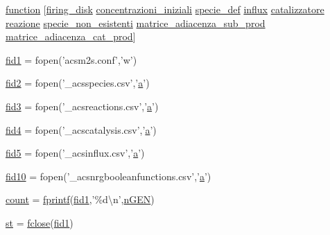 \begin{DoxyCompactItemize}
\item 
\hyperlink{a00110_a4b4c670b101bf7a838f775e008fa6255}{function} \mbox{[}\hyperlink{a00103_acb72987b5000cf59c6f81c482e2ac8ac}{firing\-\_\-disk} \hyperlink{a00103_a89801fa89eee3ba40f6610f290d6f6c3}{concentrazioni\-\_\-iniziali} \hyperlink{a00110_a85d979dc881d9a49537b0f43daa2b360}{specie\-\_\-def} \hyperlink{a00107_a902e747aeec6b345d3a057099152f41f}{influx} \hyperlink{a00102_a14959eaa108dcffcec704a207775f7e8}{catalizzatore} \hyperlink{a00110_a65cf6e12ba9a8c10222f3f1f71f7c95f}{reazione} \hyperlink{a00110_adfcfd2749a68fa87ece8ec3caa194b3d}{specie\-\_\-non\-\_\-esistenti} \hyperlink{a00104_a3568a7566d3871de5460f8fe96044c26}{matrice\-\_\-adiacenza\-\_\-sub\-\_\-prod} \hyperlink{a00104_a23c87a364bec91d4eb554b9eabe0b767}{matrice\-\_\-adiacenza\-\_\-cat\-\_\-prod}\mbox{]}
\item 
\hyperlink{a00110_aff1e821fc5f97a0758f74b5cbd00cacf}{fid1} = fopen('acsm2s.\-conf','w')
\item 
\hyperlink{a00110_a11af2c31c7926441f43875d99b4577d2}{fid2} = fopen('\-\_\-acsspecies.\-csv','\hyperlink{a00035_a2ffdbad9ea59541e59cbd2b938e0770c}{a}')
\item 
\hyperlink{a00110_a153e3250d4161f9bea4c140498016d94}{fid3} = fopen('\-\_\-acsreactions.\-csv','\hyperlink{a00035_a2ffdbad9ea59541e59cbd2b938e0770c}{a}')
\item 
\hyperlink{a00110_a28f0b3b80ef3c84a4a00660a307d2147}{fid4} = fopen('\-\_\-acscatalysis.\-csv','\hyperlink{a00035_a2ffdbad9ea59541e59cbd2b938e0770c}{a}')
\item 
\hyperlink{a00110_af5f7ad66ed343bca8289a4d44dbff04f}{fid5} = fopen('\-\_\-acsinflux.\-csv','\hyperlink{a00035_a2ffdbad9ea59541e59cbd2b938e0770c}{a}')
\item 
\hyperlink{a00110_aadad4fd2d661ea2b9f0c3a95e3f7b4ba}{fid10} = fopen('\-\_\-acsnrgbooleanfunctions.\-csv','\hyperlink{a00035_a2ffdbad9ea59541e59cbd2b938e0770c}{a}')
\item 
\hyperlink{a00110_aa0a4866d2600caeb20cfacee8eefc922}{count} = \hyperlink{a00110_aa6dc40efe43a338c9ff278260d95b4d9}{fprintf}(\hyperlink{a00110_aff1e821fc5f97a0758f74b5cbd00cacf}{fid1},'\%d\textbackslash{}n',\hyperlink{a00112_a82556659f7ba7219e55a18e9b9e63873}{n\-G\-E\-N})
\item 
\hyperlink{a00110_afbed6b4ecdae7969c5b47d7d4e71495f}{st} = \hyperlink{a00033_a66a54a4db5a27a03991b5f3034bbc6a4}{fclose}(\hyperlink{a00110_aff1e821fc5f97a0758f74b5cbd00cacf}{fid1})
\item 

\end{DoxyCompactItemize}
